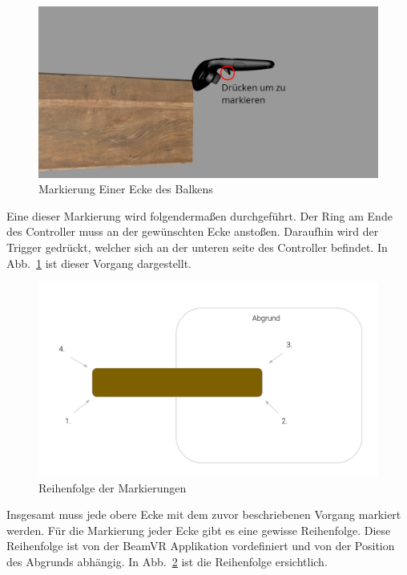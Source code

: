 \begin{figure}
    \centering
    \includegraphics[scale=0.3]{pics/beam_mark}
    \caption{Markierung Einer Ecke des Balkens}
    \label{fig:beam-mark}
\end{figure}

Eine dieser Markierung wird folgendermaßen durchgeführt.
Der Ring am Ende des Controller muss an der gewünschten Ecke anstoßen.
Daraufhin wird der Trigger gedrückt, welcher sich an der unteren seite des Controller befindet.
In Abb.~\ref{fig:beam-mark} ist dieser Vorgang dargestellt.

\begin{figure}
    \centering
    \includegraphics[scale=0.25]{pics/beam-marking-sequence}
    \caption{Reihenfolge der Markierungen}
    \label{fig:beam-marking-sequence}
\end{figure}

Insgesamt muss jede obere Ecke mit dem zuvor beschriebenen Vorgang markiert werden.
Für die Markierung jeder Ecke gibt es eine gewisse Reihenfolge.
Diese Reihenfolge ist von der BeamVR Applikation vordefiniert und von der Position des Abgrunds abhängig.
In Abb.~\ref{fig:beam-marking-sequence} ist die Reihenfolge ersichtlich.

